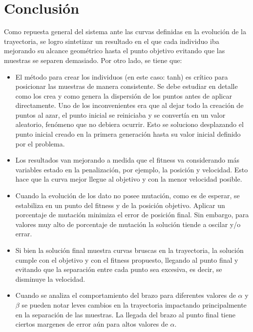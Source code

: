 \documentclass[12pt]{article}
\begin{document}
\newpage
\section{Conclusión}
Como repuesta general del sistema ante las curvas definidas en la evolución de la trayectoria, se logro sintetizar un resultado en el que cada individuo iba mejorando su alcance geométrico hasta el punto objetivo evitando que las muestras se separen demasiado. Por otro lado, se tiene que:
\begin{itemize}
    \item El método para crear los individuos (en este caso: tanh) es crítico para posicionar las muestras de manera consistente. Se debe estudiar en detalle como los crea y como genera la dispersión de los puntos antes de aplicar directamente. Uno de los inconvenientes era que al dejar todo la creación de puntos al azar, el punto inicial se reiniciaba y se convertía en un valor aleatorio, fenómeno que no debiera ocurrir. Esto se soluciono desplazando el punto inicial creado en la primera generación hasta su valor inicial definido por el problema.
    \item Los resultados van mejorando a medida que el fitness va considerando más variables estado en la penalización, por ejemplo, la posición y velocidad. Esto hace que la curva mejor llegue al objetivo y con la menor velocidad posible.
    \item Cuando la evolución de los dato no posee mutación, como es de esperar, se estabiliza en un punto del fitness y de la posición objetivo. Aplicar un porcentaje de mutación minimiza el error de posición final. Sin embargo, para valores muy alto de porcentaje de mutación la solución tiende a oscilar y/o errar.
    \item Si bien la solución final muestra curvas bruscas en la trayectoria, la solución cumple con el objetivo y con el fitness propuesto, llegando al punto final y evitando que la separación entre cada punto sea excesiva, es decir, se disminuye la velocidad.
    \item Cuando se analiza el comportamiento del brazo para diferentes valores de $\alpha$ y $\beta$ se pueden notar leves cambios en la trayectoria impactando principalmente en la separación de las muestras. La llegada del brazo al punto final tiene ciertos margenes de error aún para altos valores de $\alpha$.
\end{itemize}

\newpage


\end{document}
